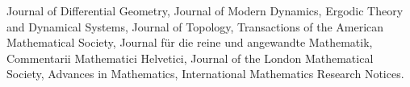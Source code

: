     \medskip

    Journal of Differential Geometry, Journal of Modern Dynamics, Ergodic Theory and Dynamical Systems, Journal of Topology, Transactions of the American Mathematical Society, Journal f\"ur die reine und angewandte Mathematik, Commentarii Mathematici Helvetici, Journal of the London Mathematical Society, Advances in Mathematics, International Mathematics Research Notices.